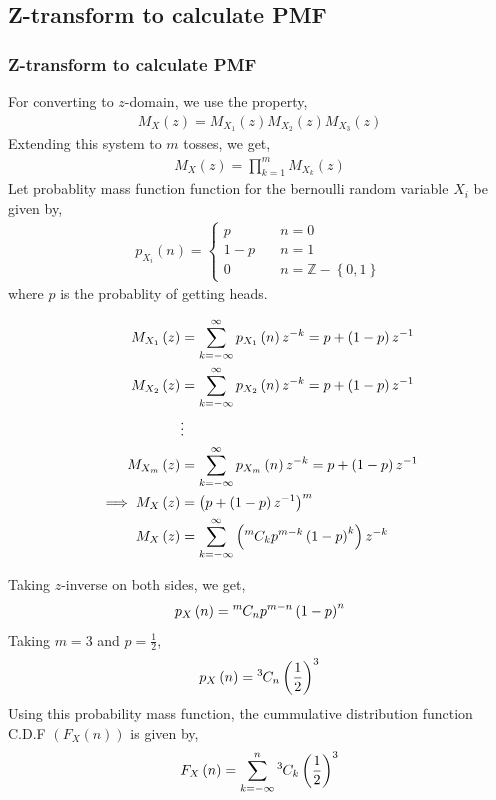 \documentclass{beamer}
\providecommand{\brak}[1]{\ensuremath{\left(#1\right)}}
\providecommand{\cbrak}[1]{\ensuremath{\left\{#1\right\}}}
\theoremstyle{remark}
\newcommand*{\permcomb}[4][0mu]{{{}^{#3}\mkern#1#2_{#4}}}
\newcommand*{\comb}[1][-1mu]{\permcomb[#1]{C}}
\numberwithin{equation}{section}
\begin{document}
\subsection{Z-transform to calculate PMF}
\begin{frame}
\frametitle{Z-transform to calculate PMF}
For converting to $z$-domain, we use the property,
\begin{align}
    M_{X}\brak{z} = M_{X_1}\brak{z} M_{X_2}\brak{z} M_{X_3}\brak{z}
\end{align}
Extending this system to $m$ tosses, we get, 
\begin{align}
    M_{X}\brak{z} = \prod_{k = 1}^{m} M_{X_{k}}\brak{z}
\end{align}
Let probablity mass function function for the bernoulli random variable $X_{i}$ be given by,
\begin{align}
    p_{X_{i}}\brak{n} = \begin{cases}
        p & \quad n = 0\\
        1 - p & \quad n = 1\\
        0 & \quad n = \mathbb{Z} - \cbrak{0, 1}
    \end{cases}
\end{align}
where $p$ is the probablity of getting heads.

\end{frame}

\begin{frame}
\begin{align}
    M_{X_1}\brak{z} &= \sum_{k = -\infty}^{\infty} p_{X_{1}}\brak{n} z^{-k} = p + \brak{1 - p} z^{-1}\\
    M_{X_2}\brak{z} &= \sum_{k = -\infty}^{\infty} p_{X_{2}}\brak{n} z^{-k} = p + \brak{1 - p} z^{-1}\\
                    &\vdots\\
    M_{X_m}\brak{z} &= \sum_{k = -\infty}^{\infty} p_{X_{m}}\brak{n} z^{-k} = p + \brak{1 - p} z^{-1}\\
    \implies M_{X}\brak{z} &= \brak{p + \brak{1 - p} z^{-1}}^{m}\\
    M_{X}\brak{z} &= \sum_{k = -\infty}^{\infty} \brak{\comb{m}{k} p^{m - k} \brak{1 - p}^{k}} z^{-k}\\
\end{align}
\end{frame}

\begin{frame}
Taking $z$-inverse on both sides, we get,
\begin{align}
    p_{X}\brak{n} = \comb{m}{n} p^{m - n} \brak{1 - p}^{n}
\end{align}
Taking $m = 3$ and $p = \frac{1}{2}$,
\begin{align}
    p_{X}\brak{n} = \comb{3}{n} \brak{\frac{1}{2}}^{3}
\end{align}
Using this probability mass function, the cummulative distribution function C.D.F $\brak{F_{X}\brak{n}}$ is given by,
\begin{align}
    F_{X}\brak{n} &= \sum_{k = -\infty}^{n}  \comb{3}{k} \brak{\frac{1}{2}}^{3}\\
\end{align}
\end{frame}
\end{document}
